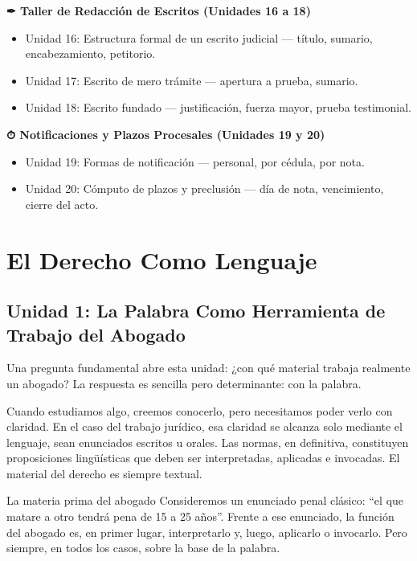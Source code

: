 \documentclass[12pt,oneside]{book}
\begin{document}
\textbf{✒ Taller de Redacción de Escritos (Unidades 16 a 18)}
\begin{itemize}
    \item Unidad 16: Estructura formal de un escrito judicial --- título, sumario, encabezamiento, petitorio.
    \item Unidad 17: Escrito de mero trámite --- apertura a prueba, sumario.
    \item Unidad 18: Escrito fundado --- justificación, fuerza mayor, prueba testimonial.
\end{itemize}

\textbf{⏱ Notificaciones y Plazos Procesales (Unidades 19 y 20)}
\begin{itemize}
    \item Unidad 19: Formas de notificación --- personal, por cédula, por nota.
    \item Unidad 20: Cómputo de plazos y preclusión --- día de nota, vencimiento, cierre del acto.
\end{itemize}


\chapter{El Derecho Como Lenguaje}

\section{Unidad 1: La Palabra Como Herramienta de Trabajo del Abogado}

Una pregunta fundamental abre esta unidad: ¿con qué material trabaja realmente un abogado? La respuesta es sencilla pero determinante: con la palabra.

Cuando estudiamos algo, creemos conocerlo, pero necesitamos poder verlo con claridad. En el caso del trabajo jurídico, esa claridad se alcanza solo mediante el lenguaje, sean enunciados escritos u orales. Las normas, en definitiva, constituyen proposiciones lingüísticas que deben ser interpretadas, aplicadas e invocadas. El material del derecho es siempre textual.

\begin{example}{La materia prima del abogado}
Consideremos un enunciado penal clásico: ``el que matare a otro tendrá pena de 15 a 25 años''. Frente a ese enunciado, la función del abogado es, en primer lugar, interpretarlo y, luego, aplicarlo o invocarlo. Pero siempre, en todos los casos, sobre la base de la palabra.
\end{example}
\end{document}

